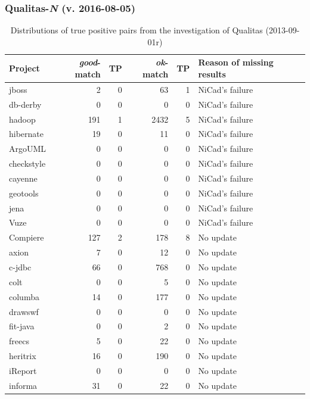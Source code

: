 \documentclass{IEEEtran}
\begin{document}
\subsubsection{Qualitas-\textit{N} (v. 2016-08-05)}

\begin{table}[H]
	\centering
	\caption{Distributions of true positive pairs from the investigation of Qualitas (2013-09-01r)}
	\label{tab:tp_pairs}
	\begin{tabular}{l|r|r|r|r|p{6cm}}
	\hline
	Project		& \textit{good}-match & TP & \textit{ok}-match & TP & Reason of missing results \\
	\hline
	jboss		& 2 	& 	0	& 63 	& 1 & NiCad's failure \\
	db-derby 	& 0 	&	0	& 0		& 0 & NiCad's failure \\
	hadoop		& 191 	& 1 	& 2432 	& 5 & NiCad's failure \\
	hibernate 	& 19 	& 	0	& 11 	& 0 & NiCad's failure \\
	ArgoUML		& 0		& 	0	& 0		& 0 & NiCad's failure \\
	checkstyle	& 0		&	0	& 0		& 0 & NiCad's failure \\
	cayenne		& 0		& 	0	& 0		& 0 & NiCad's failure \\
	geotools	& 0		& 	0	& 0		& 0 & NiCad's failure \\
	jena		& 0		& 	0	& 0		& 0 & NiCad's failure \\
	Vuze		& 0		&	0	& 0		& 0 & NiCad's failure \\
	Compiere	& 127	& 2		& 178	& 8 & No update \\
	axion		& 7		& 	0	& 12	& 0 & No update \\
	c-jdbc		& 66	&	0	& 768	& 0 & No update \\
	colt		& 0		& 	0	& 5		& 0 & No update \\
	columba		& 14	&	0	& 177	& 0 & No update \\
	drawswf		& 0		&	0	& 0		& 0 & No update \\
	fit-java	& 0		& 0		& 2 	& 0 & No update \\
	freecs		& 5		& 0		& 22	& 0 & No update \\
	heritrix	& 16	& 0		& 190 	& 0 & No update \\
	iReport		& 0		& 0 	& 0		& 0 & No update \\
	informa		& 31	& 0 	& 22	& 0 & No update \\

\end{tabular}
\end{table}
\end{document}
